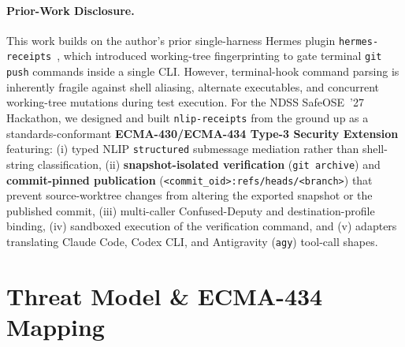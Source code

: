 \documentclass[sigconf,nonacm]{acmart}
\begin{document}
\paragraph{Prior-Work Disclosure.}
This work builds on the author's prior single-harness Hermes plugin \texttt{hermes-receipts}~\cite{hermes_receipts}, which introduced working-tree fingerprinting to gate terminal \texttt{git push} commands inside a single CLI. However, terminal-hook command parsing is inherently fragile against shell aliasing, alternate executables, and concurrent working-tree mutations during test execution. For the NDSS SafeOSE~'27 Hackathon, we designed and built \texttt{nlip-receipts} from the ground up as a standards-conformant \textbf{ECMA-430/ECMA-434 Type-3 Security Extension} featuring: (i) typed NLIP \texttt{structured} submessage mediation rather than shell-string classification, (ii) \textbf{snapshot-isolated verification} (\texttt{git archive}) and \textbf{commit-pinned publication} (\texttt{<commit\_oid>:refs/heads/<branch>}) that prevent source-worktree changes from altering the exported snapshot or the published commit, (iii) multi-caller Confused-Deputy and destination-profile binding, (iv) sandboxed execution of the verification command, and (v) adapters translating Claude Code, Codex CLI, and Antigravity (\texttt{agy}) tool-call shapes.

\section{Threat Model \& ECMA-434 Mapping}
\end{document}
